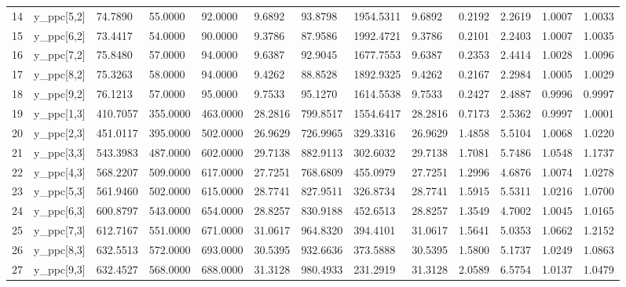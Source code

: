 \begin{table}[ht]
\begin{tabular}{rllllllllllll}
  14 & y\_ppc[5,2] &  74.7890 &  55.0000 &  92.0000 &  9.6892 &  93.8798 & 1954.5311 &  9.6892 & 0.2192 & 2.2619 & 1.0007 & 1.0033 \\ 
  15 & y\_ppc[6,2] &  73.4417 &  54.0000 &  90.0000 &  9.3786 &  87.9586 & 1992.4721 &  9.3786 & 0.2101 & 2.2403 & 1.0007 & 1.0035 \\ 
  16 & y\_ppc[7,2] &  75.8480 &  57.0000 &  94.0000 &  9.6387 &  92.9045 & 1677.7553 &  9.6387 & 0.2353 & 2.4414 & 1.0028 & 1.0096 \\ 
  17 & y\_ppc[8,2] &  75.3263 &  58.0000 &  94.0000 &  9.4262 &  88.8528 & 1892.9325 &  9.4262 & 0.2167 & 2.2984 & 1.0005 & 1.0029 \\ 
  18 & y\_ppc[9,2] &  76.1213 &  57.0000 &  95.0000 &  9.7533 &  95.1270 & 1614.5538 &  9.7533 & 0.2427 & 2.4887 & 0.9996 & 0.9997 \\ 
  19 & y\_ppc[1,3] & 410.7057 & 355.0000 & 463.0000 & 28.2816 & 799.8517 & 1554.6417 & 28.2816 & 0.7173 & 2.5362 & 0.9997 & 1.0001 \\ 
  20 & y\_ppc[2,3] & 451.0117 & 395.0000 & 502.0000 & 26.9629 & 726.9965 &  329.3316 & 26.9629 & 1.4858 & 5.5104 & 1.0068 & 1.0220 \\ 
  21 & y\_ppc[3,3] & 543.3983 & 487.0000 & 602.0000 & 29.7138 & 882.9113 &  302.6032 & 29.7138 & 1.7081 & 5.7486 & 1.0548 & 1.1737 \\ 
  22 & y\_ppc[4,3] & 568.2207 & 509.0000 & 617.0000 & 27.7251 & 768.6809 &  455.0979 & 27.7251 & 1.2996 & 4.6876 & 1.0074 & 1.0278 \\ 
  23 & y\_ppc[5,3] & 561.9460 & 502.0000 & 615.0000 & 28.7741 & 827.9511 &  326.8734 & 28.7741 & 1.5915 & 5.5311 & 1.0216 & 1.0700 \\ 
  24 & y\_ppc[6,3] & 600.8797 & 543.0000 & 654.0000 & 28.8257 & 830.9188 &  452.6513 & 28.8257 & 1.3549 & 4.7002 & 1.0045 & 1.0165 \\ 
  25 & y\_ppc[7,3] & 612.7167 & 551.0000 & 671.0000 & 31.0617 & 964.8320 &  394.4101 & 31.0617 & 1.5641 & 5.0353 & 1.0662 & 1.2152 \\ 
  26 & y\_ppc[8,3] & 632.5513 & 572.0000 & 693.0000 & 30.5395 & 932.6636 &  373.5888 & 30.5395 & 1.5800 & 5.1737 & 1.0249 & 1.0863 \\ 
  27 & y\_ppc[9,3] & 632.4527 & 568.0000 & 688.0000 & 31.3128 & 980.4933 &  231.2919 & 31.3128 & 2.0589 & 6.5754 & 1.0137 & 1.0479 \\ 
   \hline
\end{tabular}
\end{table}
